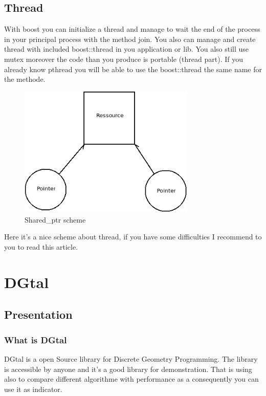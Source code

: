 \documentclass[a4paper,11pt]{report}
\begin{document}
\subsection{Thread}


With boost you can initialize a thread and manage to wait the end of the process in your principal process with the method join.
You also can manage and create thread with included boost::thread in you application or lib.
You also still use mutex moreover the code than you produce is portable (thread part).
If you already know pthread you will be able to use the boost::thread the same name for the methode.

\begin{figure}
	\center
	\includegraphics[width=0.75\textwidth]{Shared_ptr.png}
	\caption{Shared\_ptr scheme}
\end{figure}
Here it's a nice scheme about thread, if you have some difficulties I recommend to you to read this article.


\section{DGtal}
\subsection{Presentation}
\subsubsection{What is DGtal}

DGtal is a open Source library for Discrete Geometry Programming.
The library is accessible by anyone and it's a good library for demonstration.
That is using also to compare different algorithme with performance as a consequently you can use it as indicator.
\end{document}
